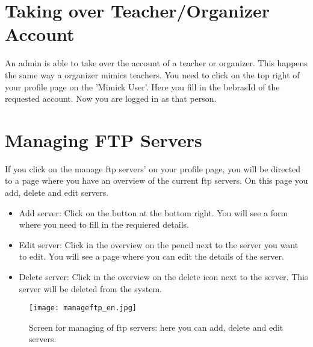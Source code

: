 \documentclass[11pt,a4paper]{report}
\begin{document}
\section{Taking over Teacher/Organizer Account}
An admin is able to take over the account of a teacher or organizer. This happens the same way a organizer mimics teachers. You need to click on the top right of your profile page on the 'Mimick User'. Here you fill in the bebrasId of the requested account. Now you are logged in as that person.
\section{Managing FTP Servers}
If you click on the manage ftp servers' on your profile page, you will be directed to a page where you have an overview of the current ftp servers. On this page you add, delete and edit servers.
\begin{itemize} 
	\item Add server: Click on the button at the bottom right. You will see a form where you need to fill in the requiered details.
	\item Edit server: Click in the overview on the pencil next to the server you want to edit. You will see a page where you can edit the details of the server.
	\item Delete server: Click in the overview on the delete icon next to the server. This server will be deleted from the system.
\end{itemize}

\begin{figure}[h!]
\centering
\texttt{[image: manageftp\_en.jpg]}
\caption{Screen for managing of ftp servers: here you can add, delete and edit servers.}
\label{fig:manageftp}
\end{figure}
\end{document}
